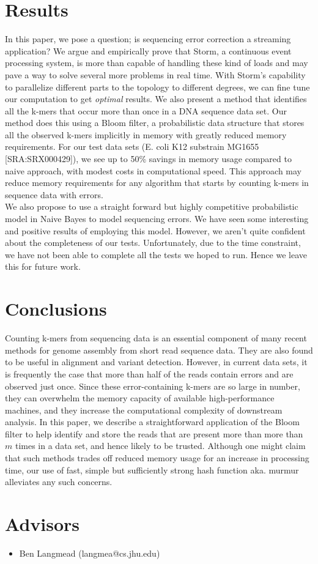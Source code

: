 \documentclass[11pt]{article}
\begin{document}
\section{Results}
In this paper, we pose a question; is sequencing error correction a streaming application? We argue and empirically prove that Storm, a continuous event processing system, is more than capable of handling these kind of loads and may pave a way to solve several more problems in real time. With Storm's capability to parallelize different parts to the topology to different degrees, we can fine tune our computation to get \emph{optimal} results. We also present a method that identifies all the k-mers that occur more than once in a DNA sequence data set. Our method does this using a Bloom filter, a probabilistic data structure that stores all the observed k-mers implicitly in memory with greatly reduced memory requirements. For our test data sets (E. coli K12 substrain MG1655 [SRA:SRX000429]), we see up to 50\% savings in memory usage compared to naive approach, with modest costs in computational speed. This approach may reduce memory requirements for any algorithm that starts by counting k-mers in sequence data with errors. \\

We also propose to use a straight forward but highly competitive probabilistic model in Naive Bayes to model sequencing errors. We have seen some interesting and positive results of employing this model. However, we aren't quite confident about the completeness of our tests. Unfortunately, due to the time constraint, we have not been able to complete all the tests we hoped to run. Hence we leave this for future work.

\section{Conclusions}
Counting k-mers from sequencing data is an essential component of many recent methods for genome assembly from short read sequence data. They are also found to be useful in alignment and variant detection. However, in current data sets, it is frequently the case that more than half of the reads contain errors and are observed just once. Since these error-containing k-mers are so large in number, they can overwhelm the memory capacity of available high-performance machines, and they increase the computational complexity of downstream analysis. In this paper, we describe a straightforward application of the Bloom filter to help identify and store the reads that are present more than more than $m$ times in a data set, and hence likely to be trusted. Although one might claim that such methods trades off reduced memory usage for an increase in processing time, our use of fast, simple but sufficiently strong hash function aka. murmur alleviates any such concerns.

\section{Advisors}
\begin{itemize}
	\item Ben Langmead (langmea@cs.jhu.edu)
\end{itemize}


\nocite{*}


\end{document}
